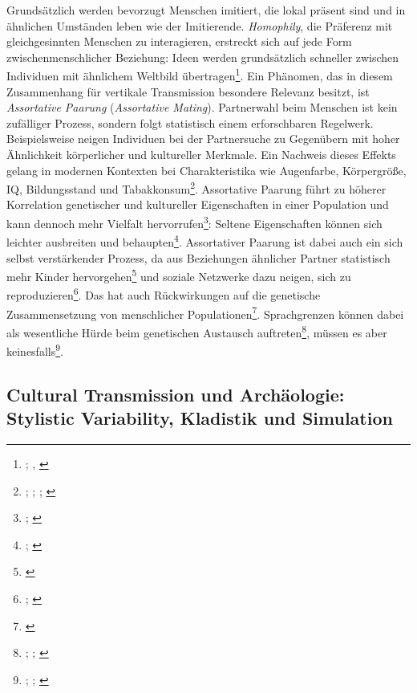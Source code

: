 \documentclass[openany,twoside,twocolumn]{book}
\let\rmarkdownfootnote\footnote%
\def\footnote{\protect\rmarkdownfootnote}
\begin{document}
Grundsätzlich werden bevorzugt Menschen imitiert, die lokal präsent sind und in ähnlichen Umständen leben wie der Imitierende. \emph{Homophily}, die Präferenz mit gleichgesinnten Menschen zu interagieren, erstreckt sich auf jede Form zwischenmenschlicher Beziehung: Ideen werden grundsätzlich schneller zwischen Individuen mit ähnlichem Weltbild übertragen\footnote{\textcite{centola_experimental_2011}; \textcite{centola_spread_2010}, \textcite{schlag_why_1998}}. Ein Phänomen, das in diesem Zusammenhang für vertikale Transmission besondere Relevanz besitzt, ist \emph{Assortative Paarung} (\emph{Assortative Mating}). Partnerwahl beim Menschen ist kein zufälliger Prozess, sondern folgt statistisch einem erforschbaren Regelwerk. Beispielsweise neigen Individuen bei der Partnersuche zu Gegenübern mit hoher Ähnlichkeit körperlicher und kultureller Merkmale. Ein Nachweis dieses Effekts gelang in modernen Kontexten bei Charakteristika wie Augenfarbe, Körpergröße, IQ, Bildungsstand und Tabakkonsum\footnote{\textcite{domingue_genetic_2014}; \textcite{keller_genetic_2013}; \textcite{laeng_why_2007}; \textcite{treur_spousal_2015}}. Assortative Paarung führt zu höherer Korrelation genetischer und kultureller Eigenschaften in einer Population und kann dennoch mehr Vielfalt hervorrufen\footnote{\textcite{feldman_evolution_1977}; \textcite{rice_multifactorial_1978}}: Seltene Eigenschaften können sich leichter ausbreiten und behaupten\footnote{\textcite{creanza_complexity_2014}; \textcite{creanza_models_2012}}. Assortativer Paarung ist dabei auch ein sich selbst verstärkender Prozess, da aus Beziehungen ähnlicher Partner statistisch mehr Kinder hervorgehen\footnote{\textcite{thiessen_human_1980}} und soziale Netzwerke dazu neigen, sich zu reproduzieren\footnote{\textcite{abdellaoui_association_2013}; \textcite{abdellaoui_educational_2015}}. Das hat auch Rückwirkungen auf die genetische Zusammensetzung von menschlicher Populationen\footnote{\textcite{robinson_genetic_2017}}. Sprachgrenzen können dabei als wesentliche Hürde beim genetischen Austausch auftreten\footnote{\textcite{barbujani_zones_1990}; \textcite{de_filippo_y-chromosomal_2011}; \textcite{karafet_coevolution_2016}}, müssen es aber keinesfalls\footnote{\textcite{hunley_gene_2005}; \textcite{hunley_genetic_2008}; \textcite{srithawong_genetic_2015}}.

\hypertarget{stylistic-variability}{%
\subsection{Cultural Transmission und Archäologie: Stylistic Variability, Kladistik und Simulation}\label{stylistic-variability}}
\end{document}
